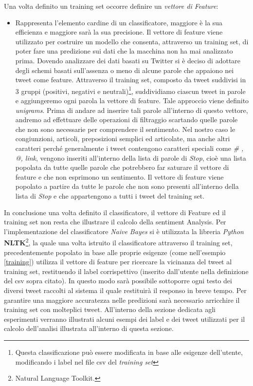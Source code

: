 Una volta definito un training set occorre definire un \textit{vettore di Feature}:
\begin{itemize}
\item Rappresenta l'elemento cardine di un classificatore, maggiore è la sua efficienza e maggiore sarà la sua precisione. Il vettore di feature viene utilizzato per costruire un modello che consenta, attraverso un training set, di poter fare una predizione sui dati che la macchina non ha mai analizzato prima.
Dovendo analizzare dei dati basati su Twitter si è deciso di adottare degli schemi basati sull'assenza o meno di alcune parole che appaiono nei tweet come feature. Attraverso il training set, composto da tweet suddivisi in 3 gruppi (positivi, negativi e neutrali)\footnote{Questa classificazione può essere modificata in base alle esigenze dell'utente, modificando i label nel file csv del \textit{training set}}, suddividiamo ciascun tweet in parole e aggiungeremo ogni parola la vettore di feature. Tale approccio viene definito \textit{unigrams}. Prima di andare ad inserire tali parole all'interno di questo vettore, andremo ad effettuare delle operazioni di filtraggio scartando quelle parole che non sono necessarie per comprendere il sentimento. 
Nel nostro caso le congiunzioni, articoli, preposizioni semplici ed articolate, ma anche altri caratteri perché generalmente i tweet contengono caratteri speciali come \textit{\# , @, link},  vengono inseriti all'interno della lista di parole di \textit{Stop}, cioè una lista popolata da tutte quelle parole che potrebbero far saturare il vettore di feature e che non esprimono un sentimento.
Il vettore di feature viene popolato a partire da tutte le parole che non sono presenti all'interno della lista di \textit{Stop} e che appartengono a tutti i tweet del training set.
\end{itemize}
 
In conclusione una volta definito il classificatore, il vettore di Feature ed il training set non resta che illustrare il calcolo della sentiment Analysis.
Per l'implementazione del classificatore \textit{Naive Bayes} si è utilizzata la libreria \textit{Python} \textbf{NLTK}\footnote{Natural Language Toolkit.}, la quale una volta istruito il classificatore attraverso il training set, precedentemente popolato in base alle proprie esigenze (come nell'esempio \ref{training}) utilizza il vettore di feature per ricercare la vicinanza del tweet al training set, restituendo il label corrispettivo (inserito dall'utente nella definizione del csv sopra citato). In questo modo sarà possibile sottoporre ogni testo dei diversi tweet raccolti al sistema il quale restituirà il responso in breve tempo. Per garantire una maggiore accuratezza nelle predizioni sarà necessario arricchire il training set con molteplici tweet. All'interno della sezione dedicata agli esperimenti verranno illustrati alcuni esempi dei label e dei tweet utilizzati per il calcolo dell'analisi illustrata all'interno di questa sezione. 

